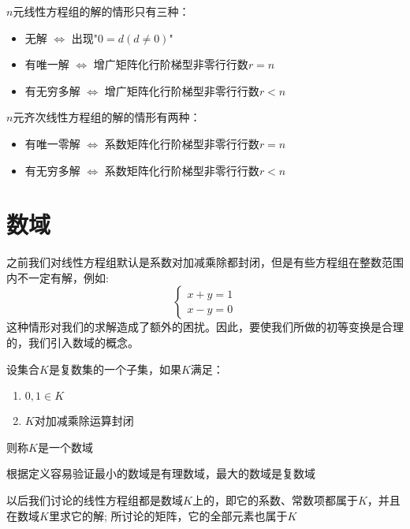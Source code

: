 \begin{theorem}[线性方程组解的情况及判定准则]
    $n$元线性方程组的解的情形只有三种：
    \begin{itemize}
        \item 无解 $\Longleftrightarrow$ 出现"$0=d(d\neq0)$"
        \item 有唯一解 $\Longleftrightarrow$ 增广矩阵化行阶梯型非零行行数$r=n$
        \item 有无穷多解 $\Longleftrightarrow$ 增广矩阵化行阶梯型非零行行数$r<n$
    \end{itemize}
\end{theorem}
\begin{corollary}
    $n$元齐次线性方程组的解的情形有两种：
    \begin{itemize}
        \item 有唯一零解  $\Longleftrightarrow$ 系数矩阵化行阶梯型非零行行数$r=n$
        \item 有无穷多解 $\Longleftrightarrow$ 系数矩阵化行阶梯型非零行行数$r<n$
    \end{itemize}
\end{corollary}

\section{数域}
之前我们对线性方程组默认是系数对加减乘除都封闭，但是有些方程组在整数范围内不一定有解，例如:
\begin{equation*}
    \begin{cases}
        x+y=1\\
        x-y=0
    \end{cases}
\end{equation*}
这种情形对我们的求解造成了额外的困扰。因此，要使我们所做的初等变换是合理的，我们引入数域的概念。
\begin{definition}[数域]
    设集合$K$是复数集的一个子集，如果$K$满足：
    \begin{enumerate}
        \item $0,1\in K$
        \item $K$对加减乘除运算封闭
    \end{enumerate}
    则称$K$是一个数域
\end{definition}
\begin{corollary}
    根据定义容易验证最小的数域是有理数域，最大的数域是复数域
\end{corollary}

以后我们讨论的线性方程组都是数域$K$上的，即它的系数、常数项都属于$K$，并且在数域$K$里求它的解;
所讨论的矩阵，它的全部元素也属于$K$